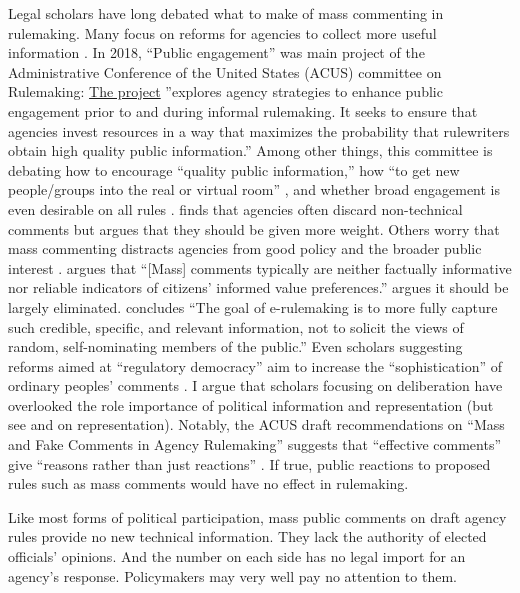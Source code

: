 Legal scholars have long debated what to make of mass commenting in rulemaking. Many focus on reforms for agencies to collect more useful information \citep{Farina2011, Farina2014, Rauch2016}. In 2018, ``Public engagement'' was main project of the Administrative Conference of the United States (ACUS) committee on Rulemaking: \href{https://www.acus.gov/research-projects/public-engagement-rulemaking}{The project} ''explores agency strategies to enhance public engagement prior to and during informal rulemaking. It seeks to ensure that agencies invest resources in a way that maximizes the probability that rulewriters obtain high quality public information.''  Among other things, this committee is debating how to encourage ``quality public information,'' how ``to get new people/groups into the real or virtual room'' \citep{Farina2018}, and whether broad engagement is even desirable on all rules \citep{White2018}. \citet{Mendelson2011} finds that agencies often discard non-technical comments but argues that they should be given more weight. Others worry that mass commenting distracts agencies from good policy and the broader public interest \citep{Coglianese2006}. \citet[p. 112]{Farina2012} argues that ``[Mass] comments typically are neither factually informative nor reliable indicators of citizens’ informed value preferences.'' \citet{Rossi1997} argues it should be largely eliminated. \citet[p. 208]{Herz2016} concludes ``The goal of e-rulemaking is to more fully capture such credible, specific, and relevant information, not to solicit the views of random, self-nominating members of the public.'' Even scholars suggesting reforms aimed at ``regulatory democracy'' aim to increase the ``sophistication'' of ordinary peoples' comments \citep{Cuellar2015}. I argue that scholars focusing on deliberation have overlooked the role importance of political information and representation (but see \citet{Reich1966} and \citet{Seifter2016UCLA} on representation).
Notably, the ACUS draft recommendations on ``Mass and Fake Comments in Agency Rulemaking'' suggests that ``effective comments'' give ``reasons rather than just reactions'' \citep[p. 33]{ACUS2018}. If true, public reactions to proposed rules such as mass comments would have no effect in rulemaking. 

Like most forms of political participation, 
mass public comments on draft agency rules provide no new technical information. 
They lack the authority of elected officials' opinions. 
And the number on each side has no legal import for an agency's response.
Policymakers may very well pay no attention to them. 


